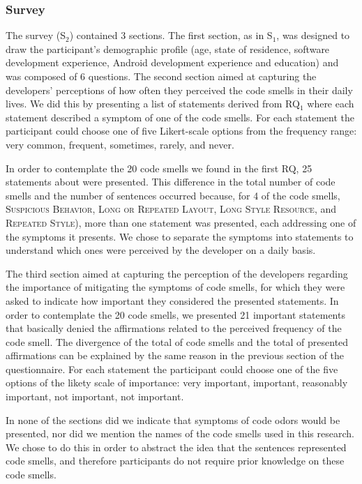 \subsubsection{Survey}
\label{etapa-2-questionario}

The survey (S$_2$) contained 3 sections. 
The first section, as in S$_1$, was designed to draw the participant's demographic profile 
(age, state of residence, software development experience, Android development experience and education) and was composed of 6 questions.
The second section aimed at capturing the developers' perceptions of how often they perceived the code smells in their daily lives. We did this by presenting a list of statements derived from RQ$_1$ where each statement described a symptom of one of the code smells. For each statement the participant could choose one of five Likert-scale options from the frequency range: very common, frequent, sometimes, rarely, and never.


In order to contemplate the 20 code smells we found in the first RQ, 25 statements about were presented. This difference in the total number of code smells and the number of sentences occurred because, for 4 of the code smells, \textsc{Suspicious Behavior}, 
\textsc{Long or Repeated Layout}, \textsc{Long Style Resource}, and \textsc{Repeated Style}), more than one statement was presented, each addressing one of the symptoms it presents. We chose to separate the symptoms into statements to understand which ones were perceived by the developer on a daily basis. 


The third section aimed at capturing the perception of the developers regarding the importance of mitigating the symptoms of code smells, for which they were asked to indicate how important they considered the presented statements. In order to contemplate the 20 code smells, we presented 21 important statements that basically denied the affirmations related to the perceived frequency of the code smell. The divergence of the total of code smells and the total of presented affirmations can be explained by the same reason in the previous section of the questionnaire. For each statement the participant could choose one of the five options of the likety scale of importance: very important, important, reasonably important, not important, not important.

In none of the sections did we indicate that symptoms of code odors would be presented, nor did we mention the names of the code smells used in this research. We chose to do this in order to abstract the idea that the sentences represented code smells, and therefore participants do not require prior knowledge on these code smells.

